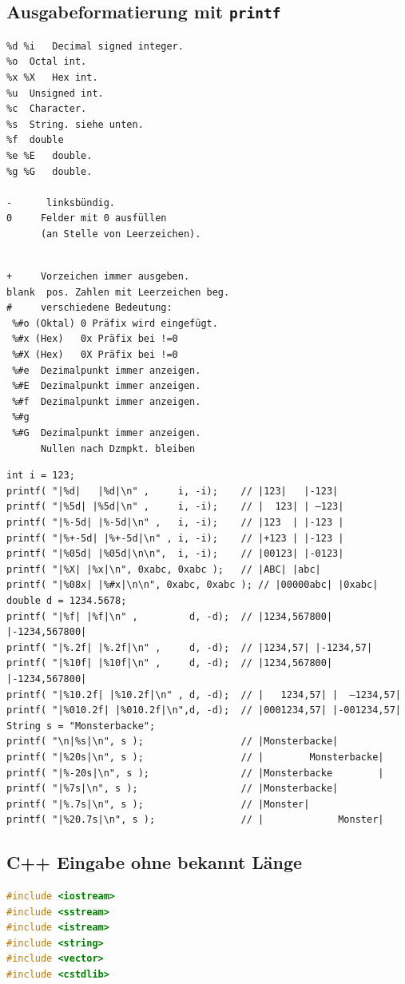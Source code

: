 \documentclass[10pt,a4paper,ngerman,oneside,]{article}
\begin{document}
\begin{multicols}{2}
\subsection{Ausgabeformatierung mit \texttt{printf}}
\begin{verbatim}
%d %i	Decimal signed integer.
%o	Octal int.
%x %X	Hex int.
%u	Unsigned int.
%c	Character.
%s	String.	siehe unten.
%f	double
%e %E	double.
%g %G	double.

-      linksbündig.
0  	  Felder mit 0 ausfüllen 
      (an Stelle von Leerzeichen).
\end{verbatim}
\begin{verbatim}

+	  Vorzeichen immer ausgeben.
blank  pos. Zahlen mit Leerzeichen beg.
# 	  verschiedene Bedeutung:
 %#o (Oktal) 0 Präfix wird eingefügt.
 %#x (Hex)   0x Präfix bei !=0
 %#X (Hex)   0X Präfix bei !=0
 %#e  Dezimalpunkt immer anzeigen.
 %#E  Dezimalpunkt immer anzeigen.
 %#f  Dezimalpunkt immer anzeigen.
 %#g  
 %#G  Dezimalpunkt immer anzeigen. 
      Nullen nach Dzmpkt. bleiben
\end{verbatim}
\begin{verbatim}
int i = 123;
printf( "|%d|   |%d|\n" ,     i, -i);    // |123|   |-123|
printf( "|%5d| |%5d|\n" ,     i, -i);    // |  123| | –123|
printf( "|%-5d| |%-5d|\n" ,   i, -i);    // |123  | |-123 |
printf( "|%+-5d| |%+-5d|\n" , i, -i);    // |+123 | |-123 |
printf( "|%05d| |%05d|\n\n",  i, -i);    // |00123| |-0123|
printf( "|%X| |%x|\n", 0xabc, 0xabc );   // |ABC| |abc|
printf( "|%08x| |%#x|\n\n", 0xabc, 0xabc ); // |00000abc| |0xabc|
double d = 1234.5678;
printf( "|%f| |%f|\n" ,         d, -d);  // |1234,567800| |-1234,567800|
printf( "|%.2f| |%.2f|\n" ,     d, -d);  // |1234,57| |-1234,57|
printf( "|%10f| |%10f|\n" ,     d, -d);  // |1234,567800| |-1234,567800|
printf( "|%10.2f| |%10.2f|\n" , d, -d);  // |   1234,57| |  –1234,57|
printf( "|%010.2f| |%010.2f|\n",d, -d);  // |0001234,57| |-001234,57|
String s = "Monsterbacke";
printf( "\n|%s|\n", s );                 // |Monsterbacke|
printf( "|%20s|\n", s );                 // |        Monsterbacke|
printf( "|%-20s|\n", s );                // |Monsterbacke        |
printf( "|%7s|\n", s );                  // |Monsterbacke|
printf( "|%.7s|\n", s );                 // |Monster|
printf( "|%20.7s|\n", s );               // |             Monster|
\end{verbatim}
\subsection{C++ Eingabe ohne bekannt Länge}
\begin{lstlisting}[language=C++]
#include <iostream>
#include <sstream>
#include <istream>
#include <string>
#include <vector>
#include <cstdlib>


\end{lstlisting}
\end{multicols}
\end{document}
